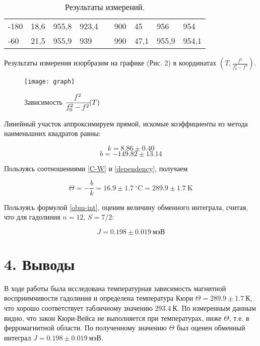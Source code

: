 \documentclass[a4paper,12pt]{article}
\begin{document}
\begin{table}[H]
\begin{tabular}{|l|l|l|l|l|l|l|l|l|}
-180                         & 18,6                      & 955,8                         & 923,4                       &  & 900                         & 45                        & 956                           & 954                         \\ \cline{1-4} \cline{6-9} 
-60                          & 21,5                      & 955,9                         & 939                         &  & 990                         & 47,1                      & 955,9                         & 954,1                       \\ \cline{1-4} \cline{6-9} 
\end{tabular} \caption{Результаты измерений.}
\end{table} 

Результаты измерения изорбразим на графике (Рис. 2) в координатах $\left( T, \frac{f^2}{f_0^2-f^2}\right)$.

\begin{figure}[H]
    \centering
    \texttt{[image: graph]}
    \caption{Зависимость $\cfrac{f^2}{f_0^2-f^2}(T)$}
\end{figure}

Линейный участок аппроксимируем прямой, искомые коэффициенты из метода наименьшних квадратов равны:

\[k = 8.86 \pm 0.40\]
\[b = -149.82 \pm 13.14\]

Пользуясь соотношениями \eqref{C-W} и \eqref{dependency}, получаем

\[\Theta = -\dfrac{b}{k} = 16.9 \pm 1.7~\text{$^\circ$C} = 289.9 \pm 1.7~\text{K}\]

Пользуясь формулой \eqref{obm-int}, оценим величину обменного интеграла, считая, что для гадолиния $n = 12$, $S = 7/2$:

\[J = 0.198\pm 0.019~\text{мэВ}\]

\section*{4. Выводы}
В ходе работы была исследована температурная зависимость магнитной восприимчивости гадолиния и определена температура Кюри $\Theta = 289.9 \pm 1.7~\text{К}$, что хорошо соответствует табличному значению $293.4~\text{К}$. По измеренным данным видно, что закон Кюри-Вейса не выполняется при температурах, ниже $\Theta$, т.е. в ферромагнитной области. По полученному значению $\Theta$ был оценен обменный интеграл $J = 0.198\pm 0.019~\text{мэВ}$.
\end{document}
